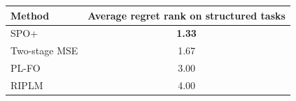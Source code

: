 \begin{tabular}{lc}
\toprule
Method & Average regret rank on structured tasks \\
\midrule
SPO+ & \textbf{1.33} \\
Two-stage MSE & 1.67 \\
PL-FO & 3.00 \\
RIPLM & 4.00 \\
\bottomrule
\end{tabular}